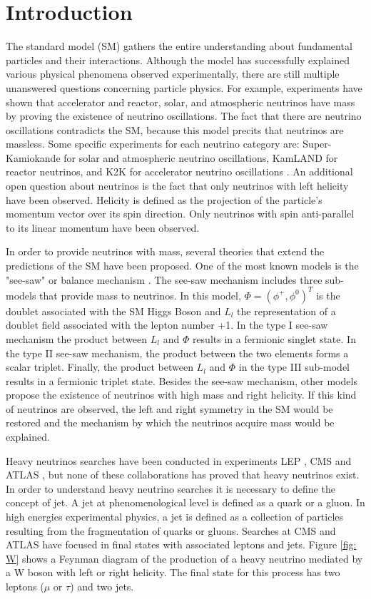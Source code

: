 \chapter{Introduction}

The standard model (SM) gathers the entire understanding about fundamental particles and their interactions. Although the model has successfully explained various physical phenomena observed experimentally, there are still multiple unanswered questions concerning particle physics. For example, experiments \cite{Detectores} have shown that accelerator and reactor, solar, and atmospheric neutrinos have mass by proving the existence of neutrino oscillations. The fact that there are neutrino oscillations contradicts the SM, because this model precits that neutrinos are massless. Some specific experiments for each neutrino category are: Super-Kamiokande \cite{Super-Kamiokande} for solar and atmospheric neutrino oscillations, KamLAND \cite{KamLAND} for reactor neutrinos, and K2K \cite{K2K} for accelerator neutrino oscillations \cite{Experimentos}. An additional open question about neutrinos is the fact that only neutrinos with left helicity have been observed. Helicity is defined as the projection of the particle's momentum vector over its spin direction. Only neutrinos with spin anti-parallel to its linear momentum have been observed.

In order to provide neutrinos with mass, several theories that extend the predictions of the SM have been proposed. One of the most known models is the "see-saw" or balance mechanism \cite{See-saw}. The see-saw mechanism includes three sub-models that provide mass to neutrinos. In this model, $\Phi = (\phi^{+}, \phi^{0})^{T}$ is the doublet associated with the SM Higgs Boson and $L_{l}$ the representation of a doublet field associated with the lepton number +1. In the type I see-saw mechanism the product between $L_{l}$ and $\Phi$ results in a fermionic singlet state. In the type II see-saw mechanism, the product between the two elements forms a scalar triplet. Finally, the product between $L_{l}$ and $\Phi$ in the type III sub-model results in a fermionic triplet state. Besides the see-saw mechanism, other models propose the existence of neutrinos with high mass and right helicity. If this kind of neutrinos are observed, the left and right symmetry in the SM would be restored and the mechanism by which the neutrinos acquire mass would be explained.

Heavy neutrinos searches have been conducted in experiments LEP \cite{LEP}, CMS and ATLAS \cite{CMS ATLAS}, but none of these collaborations has proved that heavy neutrinos exist. In order to understand heavy neutrino searches it is necessary to define the concept of jet. A jet at phenomenological level is defined as a quark or a gluon. In high energies experimental physics, a jet is defined as a collection of particles resulting from the fragmentation of quarks or gluons. Searches at CMS and ATLAS have focused in final states with associated leptons and jets. Figure \ref{fig: W} shows a Feynman diagram of the production of a heavy neutrino mediated by a W boson with left or right helicity. The final state for this process has two leptons ($\mu$ or $\tau$) and two jets.


